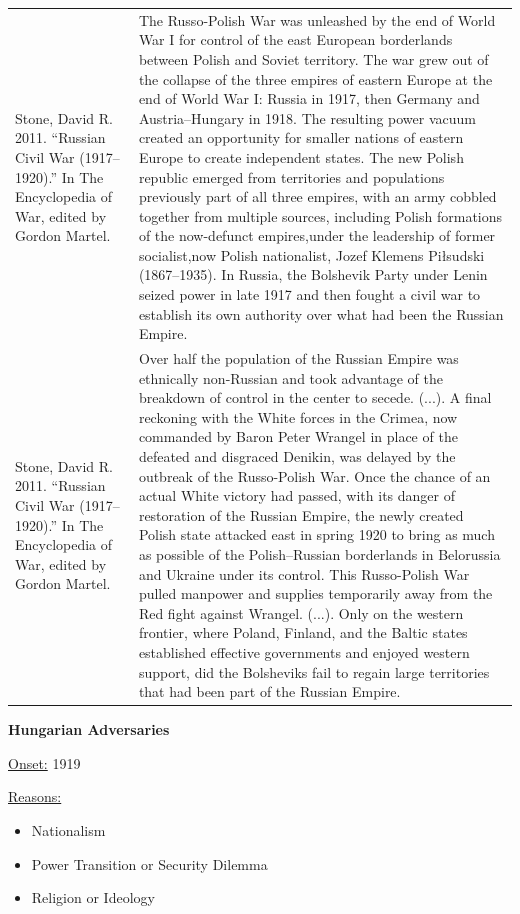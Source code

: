 {\begin{longtable}{p{}p{}}
\\
Stone, David R. 2011. “Russian Civil War (1917–1920).” In The Encyclopedia of War, edited by Gordon Martel. & The Russo-Polish War was unleashed by the end of World War I for control of the east European borderlands between Polish and Soviet territory. The war grew out of the collapse of the three empires of eastern Europe at the end of World War I: Russia in 1917, then Germany and Austria–Hungary in 1918. The resulting power vacuum created an opportunity for smaller nations of eastern Europe to create independent states. The new Polish republic emerged from territories and populations previously part of all three empires, with an army cobbled together from multiple sources, including Polish formations of the now-defunct empires,under the leadership of former socialist,now Polish nationalist, Jozef Klemens Piłsudski (1867–1935). In Russia, the Bolshevik Party under Lenin seized power in late 1917 and then fought a civil war to establish its own authority over what had been the Russian Empire.
\\
Stone, David R. 2011. “Russian Civil War (1917–1920).” In The Encyclopedia of War, edited by Gordon Martel. & Over half the population of the Russian Empire was ethnically non-Russian and took advantage of the breakdown of control in the center to secede. (...). A final reckoning with the White forces in the Crimea, now commanded by Baron Peter Wrangel in place of the defeated and disgraced Denikin, was delayed by the outbreak of the Russo-Polish War. Once the chance of an actual White victory had passed, with its danger of restoration of the Russian Empire, the newly created Polish state attacked east in spring 1920 to bring as much as possible of the Polish–Russian borderlands in Belorussia and Ukraine under its control. This Russo-Polish War pulled manpower and supplies temporarily away from the Red fight against Wrangel. (...). Only on the western frontier, where Poland, Finland, and the Baltic states established effective governments and enjoyed western support, did the Bolsheviks fail to regain large territories that had been part of the Russian Empire.
\\
\end{longtable}}
\clearpage
         \textbf{Hungarian Adversaries} 

          \underline{Onset:} 1919         

\underline{Reasons:}
\begin{itemize}
\item Nationalism
\item Power Transition or Security Dilemma
\item Religion or Ideology
\end{itemize}

